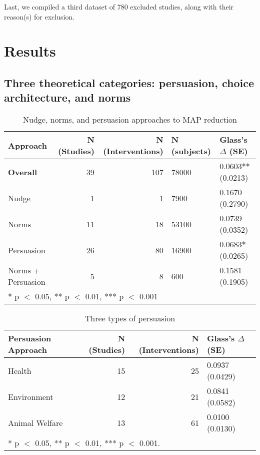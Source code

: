 \documentclass[sn-nature,pdflatex]{sn-jnl}
\begin{document}
Last, we compiled a third dataset of 780 excluded studies, along with
their reason(s) for exclusion.

\section{Results}\label{sec2}

\subsection{Three theoretical categories: persuasion, choice
architecture, and norms}\label{sec2.1}

\begin{table}[!h]
\centering
\caption{\label{tab:tab:table_one}Nudge, norms, and persuasion approaches to MAP reduction}
\centering
\begin{tabular}[t]{lrrll}
\toprule
Approach & N (Studies) & N (Interventions) & N (subjects) & Glass's $\Delta$ (SE)\\
\midrule
\textbf{Overall} & 39 & 107 & 78000 & 0.0603** (0.0213)\\
Nudge & 1 & 1 & 7900 & 0.1670 (0.2790)\\
Norms & 11 & 18 & 53100 & 0.0739 (0.0352)\\
Persuasion & 26 & 80 & 16900 & 0.0683* (0.0265)\\
Norms + Persuasion & 5 & 8 & 600 & 0.1581 (0.1905)\\
\bottomrule
\multicolumn{5}{l}{\rule{0pt}{1em}* p $<$ 0.05, ** p $<$ 0.01, *** p $<$ 0.001}\\
\end{tabular}
\end{table}

\begin{table}[!h]
\centering
\caption{\label{tab:tab:table_two}Three types of persuasion}
\centering
\begin{tabular}[t]{lrrl}
\toprule
Persuasion Approach & N (Studies) & N (Interventions) & Glass's $\Delta$ (SE)\\
\midrule
Health & 15 & 25 & 0.0937 (0.0429)\\
Environment & 12 & 21 & 0.0841 (0.0582)\\
Animal Welfare & 13 & 61 & 0.0100 (0.0130)\\
\bottomrule
\multicolumn{4}{l}{\rule{0pt}{1em}* p $<$ 0.05, ** p $<$ 0.01, *** p $<$ 0.001.}\\
\end{tabular}
\end{table}
\end{document}
